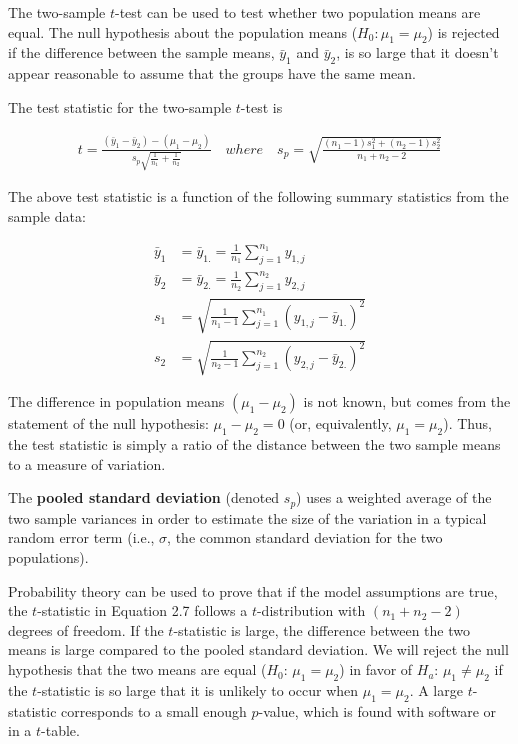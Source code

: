 \documentclass[
]{report}
\begin{document}
The two-sample \(t\)-test can be used to test whether two population means are equal. The null hypothesis about the population means (\(H_0: \mu_1 = \mu_2\)) is rejected if the difference between the sample means, \(\bar{y}_1\) and \(\bar{y}_2\), is so large that it doesn't appear reasonable to assume that the groups have the same mean.

The test statistic for the two-sample \(t\)-test is

\begin{align} \label{2.7}
t = \frac{(\bar{y}_1 - \bar{y}_2) - (\mu_1 - \mu_2)}{s_p\sqrt{\frac{1}{n_1} + \frac{1}{n_2}}} 
\quad where \quad
s_p = \sqrt{\frac{(n_1-1)s_1^2 + (n_2-1)s_2^2}{n_1 + n_2 - 2}}
\tag{2.7}
\end{align}

The above test statistic is a function of the following summary statistics from the sample data:

\begin{align}
\bar{y}_1 &= \bar{y}_{1.} = \frac{1}{n_1}\sum_{j=1}^{n_1}y_{1,j} \\
\bar{y}_2 &= \bar{y}_{2.} = \frac{1}{n_2}\sum_{j=1}^{n_2}y_{2,j} \\
s_1 &= \sqrt{\frac{1}{n_1 - 1}\sum_{j=1}^{n_1}(y_{1,j} - \bar{y}_{1.})^2} \\
s_2 &= \sqrt{\frac{1}{n_2 - 1}\sum_{j=1}^{n_2}(y_{2,j} - \bar{y}_{2.})^2}
\end{align}

The difference in population means \((\mu_1 - \mu_2)\) is not known, but comes from the statement of the null hypothesis: \(\mu_1 - \mu_2 = 0\) (or, equivalently, \(\mu_1 = \mu_2\)). Thus, the test statistic is simply a ratio of the distance between the two sample means to a measure of variation.

The \textbf{pooled standard deviation} (denoted \(s_p\)) uses a weighted average of the two sample variances in order to estimate the size of the variation in a typical random error term (i.e., \(\sigma\), the common standard deviation for the two populations).

Probability theory can be used to prove that if the model assumptions are true, the \(t\)-statistic in Equation 2.7 follows a \(t\)-distribution with \((n_1 + n_2 - 2)\) degrees of freedom. If the \(t\)-statistic is large, the difference between the two means is large compared to the pooled standard deviation. We will reject the null hypothesis that the two means are equal (\(H_0\): \(\mu_1 = \mu_2\)) in favor of \(H_a\): \(\mu_1 \ne \mu_2\) if the \(t\)-statistic is so large that it is unlikely to occur when \(\mu_1 = \mu_2\). A large \(t\)-statistic corresponds to a small enough \(p\)-value, which is found with software or in a \(t\)-table.
\end{document}
